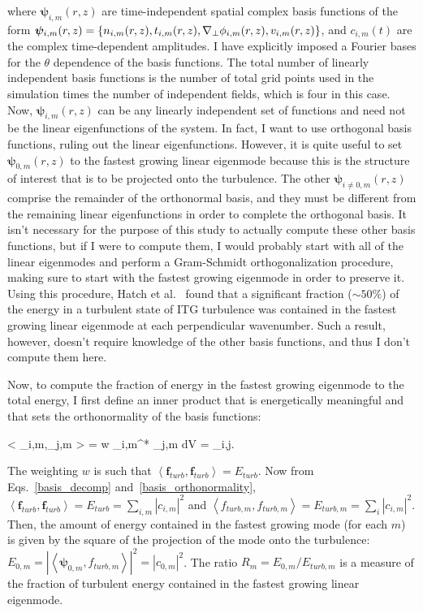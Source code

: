where $\bm{\psi}_{i,m}(r,z)$ are time-independent spatial complex basis functions of the form $\bm{\psi}_{i,m}(r,z) = \left\{ n_{i,m}(r,z),t_{i,m}(r,z),\nabla_\perp \phi_{i,m}(r,z), v_{i,m}(r,z) \right\}$,
and $c_{i,m}(t)$ are the complex time-dependent amplitudes. I have explicitly imposed a Fourier bases for the $\theta$ dependence of the basis functions. The total number of
linearly independent basis functions is the number of total grid points used in the simulation times the number of independent fields, which is four in this case.
Now, $\bm{\psi}_{i,m}(r,z)$ can be any linearly independent set of functions and need not be the linear eigenfunctions
of the system. In fact, I want to use orthogonal basis functions, ruling out the linear eigenfunctions.
However, it is quite useful to set $\bm{\psi}_{0,m}(r,z)$ to the fastest
growing linear eigenmode because this is the structure of interest that is to be projected onto the turbulence. 
The other $\bm{\psi}_{i \ne 0,m}(r,z)$ comprise the remainder of the orthonormal basis, and they must be different from
the remaining linear eigenfunctions in order to complete the orthogonal basis. It isn't necessary for the purpose of this study to actually compute these other basis functions, but if I were to compute
them, I would probably start with all of the linear eigenmodes
and perform a Gram-Schmidt orthogonalization procedure, making sure to start with the fastest growing eigenmode in order to preserve it. Using this procedure, Hatch et al.~\cite{hatch2011}
found that a significant fraction ($\sim 50\%$) of the energy in a turbulent state of ITG turbulence was contained in the fastest growing linear eigenmode at each perpendicular wavenumber.
Such a result, however, doesn't require knowledge of the other basis functions, and thus I don't compute them here.

Now, to compute the fraction of energy in the fastest growing eigenmode to the total energy, 
I first define an inner product that is energetically meaningful and that sets the orthonormality of the basis functions:

\beq
\label{basis_orthonormality}
\left< \bm{\psi}_{i,m},\bm{\psi}_{j,m} \right> = \int w \bm{\psi}_{i,m}^* \cdot \bm{\psi}_{j,m} dV = \delta_{i,j}.
\eeq

The weighting $w$ is such that $\left< \bm{f}_{turb}, \bm{f}_{turb} \right> = E_{turb}$.
Now from Eqs.~\ref{basis_decomp} and~\ref{basis_orthonormality}, $\left< \bm{f}_{turb}, \bm{f}_{turb} \right> = E_{turb} = \sum_{i,m} |c_{i,m}|^2$ and 
$\left< f_{turb,m}, f_{turb,m} \right> = E_{turb,m} = \sum_i |c_{i,m}|^2$.
Then, the amount of energy contained in the fastest growing mode (for each $m$) is given by the square of the projection
of the mode onto the turbulence: $E_{0,m} = \left| \left< \bm{\psi}_{0,m}, f_{turb,m} \right> \right|^2 = |c_{0,m}|^2$. The ratio 
$R_m = E_{0,m}/E_{turb,m}$ is a measure of the fraction of turbulent energy contained in the fastest growing linear eigenmode. 

